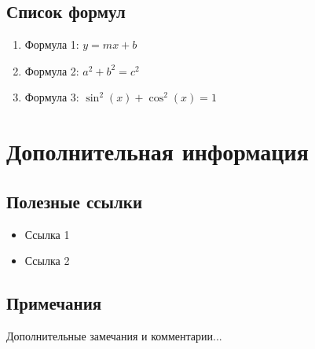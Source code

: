 \documentclass[10pt,landscape,a4paper]{article}
\begin{document}
\begin{multicols}{2}
\subsection{Список формул}
\begin{enumerate}
    \item Формула 1: $y = mx + b$
    \item Формула 2: $a^2 + b^2 = c^2$
    \item Формула 3: $\sin^2(x) + \cos^2(x) = 1$
\end{enumerate}

\section{Дополнительная информация}

\subsection{Полезные ссылки}
\begin{itemize}
    \item Ссылка 1
    \item Ссылка 2
\end{itemize}

\subsection{Примечания}
Дополнительные замечания и комментарии...

\end{multicols}
\end{document}
